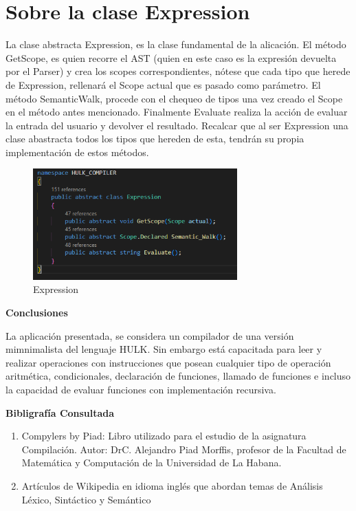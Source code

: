 \documentclass[10pt,a4paper]{article}
\begin{document}
\section*{Sobre la clase Expression}
La clase abstracta Expression, es la clase fundamental de la alicaci\'on. El m\'etodo GetScope, es quien recorre el AST (quien en este caso es la expresi\'on devuelta por el Parser) y crea los scopes correspondientes, n\'otese que cada tipo que herede de Expression, rellenar\'a el Scope actual que es pasado como par\'ametro. El m\'etodo SemanticWalk, procede con el chequeo de tipos una vez creado el Scope en el m\'etodo antes mencionado. Finalmente Evaluate realiza la acci\'on de evaluar la entrada del usuario y devolver el resultado. Recalcar que al ser Expression una clase abastracta todos los tipos que hereden de esta, tendr\'an su propia implementaci\'on de estos m\'etodos.\\
 \begin{figure}[!h] \label{Expression}
 \centering
 \includegraphics[width = 0.7\textwidth]{Expression.png}
 \caption{Expression}
 \end{figure}
 
 \begin{center}
 \textbf{Conclusiones}
 \end{center}
La aplicaci\'on presentada, se considera un compilador de una versi\'on mimnimalista del lenguaje HULK. Sin embargo est\'a capacitada para leer y realizar operaciones con instrucciones que posean cualquier tipo de operaci\'on aritm\'etica, condicionales, declaraci\'on de funciones, llamado de funciones e incluso la capacidad de evaluar funciones con implementaci\'on recursiva.
\begin{center}
\textbf{Bibligraf\'ia Consultada}
\begin{enumerate}
\item Compylers by Piad: Libro utilizado para el estudio de la asignatura Compilaci\'on. Autor: DrC. Alejandro Piad Morffis, profesor de la Facultad de Matem\'atica y Computaci\'on de la Universidad de La Habana.
\item Art\'iculos de Wikipedia en idioma ingl\'es que abordan temas de An\'alisis L\'exico, Sint\'actico y Sem\'antico
\end{enumerate}
\end{center}
\end{document}
